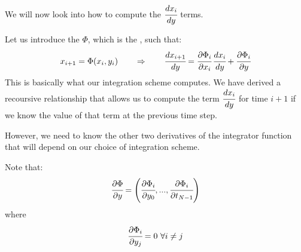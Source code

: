 We will now look into how to compute the $\cfrac{dx_i}{dy}$ terms.

Let us introduce the  $\Phi$, which is the , such that:
\[x_{i+1} = \Phi(x_i, y_i)\qquad\Rightarrow \qquad\cfrac{dx_{i+1}}{dy} = \cfrac{\partial\Phi_i}{\partial x_i}\,\cfrac{dx_i}{dy} + \cfrac{\partial\Phi_i}{\partial y}\]
This is basically what our integration scheme computes. We have derived a recoursive relationship that allows us to compute the term $\cfrac{dx_i}{dy}$ for time $i+1$ if we know the value of that term  at the previous time step. 

However, we need to know the other two derivatives of the integrator function that will depend on our choice of integration scheme.

Note that:
\[\cfrac{\partial\Phi}{\partial y} = \left(\cfrac{\partial\Phi_i}{\partial y_0},...,\cfrac{\partial\Phi_i}{\partial t_{N-1}}\right)\]
where 
\[\cfrac{\partial\Phi_i}{\partial y_j} = 0\,\,\forall i\ne j\]

